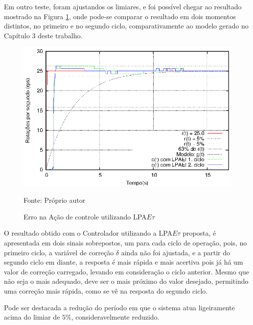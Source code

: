 Em outro teste, foram ajustandos os limiares,
e foi possível chegar ao resultado mostrado na Figura \ref{fig:LPAEterro}, 
onde pode-se comparar o resultado em dois momentos distintos,
no primeiro e no segundo ciclo,
comparativamente ao modelo gerado no Capítulo 3 deste trabalho.


\begin{figure}[!htb]%
\caption{Erro na Ação de controle utilizando LPA$E\tau$}
\vspace{-1cm}\center\includegraphics[scale=1.5]{./imagens/LPAEt-erro.eps}
\label{fig:LPAEterro}

{\small Fonte: Próprio autor}
\end{figure}


O resultado obtido com o Controlador utilizando a 
LPA$E\tau$ proposta, é apresentada em dois sinais sobrepostos,
um para cada ciclo de operação, 
pois, no primeiro ciclo, a variável de correção $\delta$
ainda não foi ajustada, e a partir do segundo ciclo em diante, 
a resposta é mais rápida e mais acertiva pois já há um
valor de correção carregado, 
levando em consideração o ciclo anterior. 
Mesmo que não seja o mais adequado, 
deve ser o mais próximo do valor desejado, 
permitindo uma correção mais rápida, 
como se vê na resposta do segundo ciclo.


Pode ser destacada a redução do período em que o sistema atua
ligeiramente acima do limiar de $5\%$, consideravelmente reduzido.


